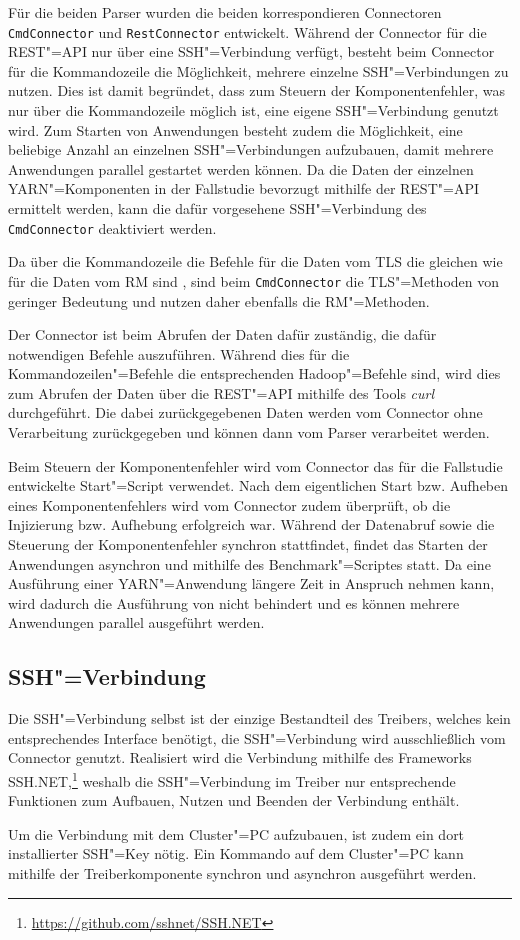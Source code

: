 Für die beiden Parser wurden die beiden korrespondieren Connectoren \texttt{CmdConnector} und \texttt{RestConnector} entwickelt.
Während der Connector für die REST"=API nur über eine SSH"=Verbindung verfügt, besteht beim Connector für die Kommandozeile die Möglichkeit, mehrere einzelne SSH"=Verbindungen zu nutzen.
Dies ist damit begründet, dass zum Steuern der Komponentenfehler, was nur über die Kommandozeile möglich ist, eine eigene SSH"=Verbindung genutzt wird.
Zum Starten von Anwendungen besteht zudem die Möglichkeit, eine beliebige Anzahl an einzelnen SSH"=Verbindungen aufzubauen, damit mehrere Anwendungen parallel gestartet werden können.
Da die Daten der einzelnen YARN"=Komponenten in der Fallstudie bevorzugt mithilfe der REST"=API ermittelt werden, kann die dafür vorgesehene SSH"=Verbindung des \texttt{CmdConnector} deaktiviert werden.

Da über die Kommandozeile die Befehle für die Daten vom \ac{TLS} die gleichen wie für die Daten vom \ac{RM} sind \cite{HadoopYarnTlServer271,HadoopYarnCmds271}, sind beim \texttt{CmdConnector} die \ac{TLS}"=Methoden von geringer Bedeutung und nutzen daher ebenfalls die \ac{RM}"=Methoden.

Der Connector ist beim Abrufen der Daten dafür zuständig, die dafür notwendigen Befehle auszuführen.
Während dies für die Kommandozeilen"=Befehle die entsprechenden Hadoop"=Befehle sind, wird dies zum Abrufen der Daten über die REST"=API mithilfe des Tools \emph{curl} durchgeführt.
Die dabei zurückgegebenen Daten werden vom Connector ohne Verarbeitung zurückgegeben und können dann vom Parser verarbeitet werden.

Beim Steuern der Komponentenfehler wird vom Connector das für die Fallstudie entwickelte Start"=Script verwendet.
Nach dem eigentlichen Start bzw. Aufheben eines Komponentenfehlers wird vom Connector zudem überprüft, ob die Injizierung bzw. Aufhebung erfolgreich war.
Während der Datenabruf sowie die Steuerung der Komponentenfehler synchron stattfindet, findet das Starten der Anwendungen asynchron und mithilfe des Benchmark"=Scriptes statt.
Da eine Ausführung einer YARN"=Anwendung längere Zeit in Anspruch nehmen kann, wird dadurch die Ausführung von \sS nicht behindert und es können mehrere Anwendungen parallel ausgeführt werden.

\subsection{SSH"=Verbindung}
\label{sec:sshConnection}

Die SSH"=Verbindung selbst ist der einzige Bestandteil des Treibers, welches kein entsprechendes Interface benötigt, die SSH"=Verbindung wird ausschließlich vom Connector genutzt.
Realisiert wird die Verbindung mithilfe des Frameworks SSH.NET,\footnote{\url{https://github.com/sshnet/SSH.NET}} weshalb die SSH"=Verbindung im Treiber nur entsprechende Funktionen zum Aufbauen, Nutzen und Beenden der Verbindung enthält.

Um die Verbindung mit dem Cluster"=PC aufzubauen, ist zudem ein dort installierter SSH"=Key nötig.
Ein Kommando auf dem Cluster"=PC kann mithilfe der Treiberkomponente synchron und asynchron ausgeführt werden.
